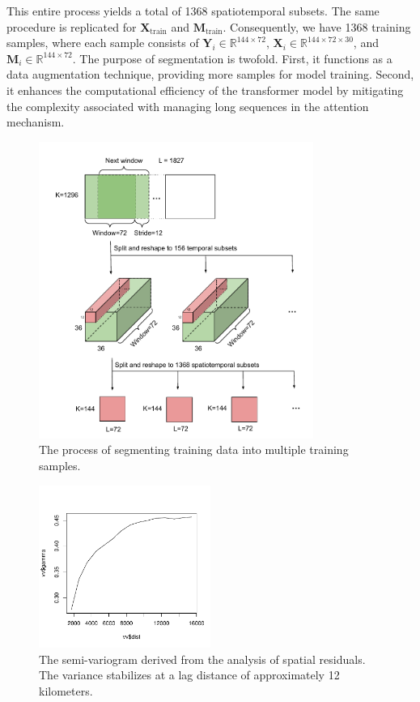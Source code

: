 \documentclass[review]{elsarticle}
\begin{document}
This entire process yields a total of 1368 spatiotemporal subsets. The same procedure is replicated for $\boldsymbol{X}_{\text{train}}$ and $\boldsymbol{M}_{\text{train}}$. Consequently, we have 1368 training samples, where each sample consists of $\boldsymbol{Y}_i \in \mathbb{R}^{144\times 72}$, $\boldsymbol{X}_i \in \mathbb{R}^{144 \times 72 \times 30}$, and $\boldsymbol{M}_i \in \mathbb{R}^{144 \times 72}$. The purpose of segmentation is twofold. First, it functions as a data augmentation technique, providing more samples for model training. Second, it enhances the computational efficiency of the transformer model by mitigating the complexity associated with managing long sequences in the attention mechanism. 




\begin{figure}
\centering
\includegraphics[width=0.8\textwidth]{figure/data_split.pdf}
\caption{ The process of segmenting training data into multiple training samples.}
\label{fig: data_split}
\end{figure}

\begin{figure}
\centering
\includegraphics[width=0.5\textwidth]{figure/variogram.pdf}
\caption{The semi-variogram derived from the analysis of spatial residuals. The variance stabilizes at a lag distance of approximately 12 kilometers.}
\label{fig: variogram}
\end{figure}
\end{document}

